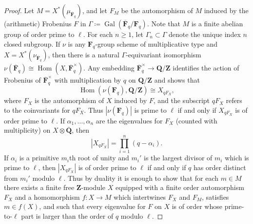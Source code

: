 \documentclass[reqno]{amsart}
\numberwithin{equation}{subsection}
\newcommand{\F}{\mathbf{F}}
\newcommand{\Q}{\mathbf{Q}}
\newcommand{\Z}{\mathbf{Z}}
\newcommand{\Gal}{\operatorname{Gal}}
\newcommand{\ol}[1]{\overline{#1}}
\newcommand{\co}{\colon}
\DeclareMathOperator{\Hom}{Hom}
\theoremstyle{remark}
\numberwithin{equation}{subsection}
\numberwithin{figure}{subsection}
\begin{document}
\begin{proof}
    Let $M = X^*(\mu_{\ol\F_q})$, and let $F_M$ be the automorphism of $M$ induced by the (arithmetic) Frobenius $F$ in $\Gamma \coloneqq \Gal(\ol\F_q/\F_q)$. Note that $M$ is a finite abelian group of order prime to $\ell$. For each $n \geq 1$, let $\Gamma_n \subset \Gamma$ denote the unique index $n$ closed subgroup. If $\nu$ is any $\F_q$-group scheme of multiplicative type and $X = X^*(\nu_{\ol\F_q})$, then there is a natural $\Gamma$-equivariant isomorphism $\nu(\ol\F_q) \cong \Hom(X, \ol\F_q^\times)$. Any embedding $\ol\F_q^\times \to \Q/\Z$ identifies the action of Frobenius of $\ol\F_q^\times$ with multiplication by $q$ on $\Q/\Z$ and shows that
    \[
    \Hom(\nu(\F_q), \Q/\Z) \cong X_{qF_X},
    \]
    where $F_X$ is the automorphism of $X$ induced by $F$, and the subscript $qF_X$ refers to the coinvariants for $qF_X$. Thus $|\nu(\F_q)|$ is prime to $\ell$ if and only if $X_{qF_X}$ is of order prime to $\ell$. If $\alpha_1, \dots, \alpha_n$ are the eigenvalues for $F_X$ (counted with multiplicity) on $X \otimes \ol\Q$, then
    \[
    |X_{qF_X}| = \prod_{i=1}^n (q - \alpha_i).
    \]
    If $\alpha_i$ is a primitive $m_i$th root of unity and $m_i'$ is the largest divisor of $m_i$ which is prime to $\ell$, then $|X_{qF_X}|$ is of order prime to $\ell$ if and only if $q$ has order distinct from $m_i'$ modulo $\ell$. Thus by duality it is enough to show that for each $m \in M$ there exists a finite free $\Z$-module $X$ equipped with a finite order automorphism $F_X$ and a homomorphism $f\co X \to M$ which intertwines $F_X$ and $F_M$, satisfies $m \in f(X)$, and such that every eigenvalue for $F$ on $X$ is of order whose prime-to-$\ell$ part is larger than the order of $q$ modulo $\ell$.


\end{proof}
\end{document}
